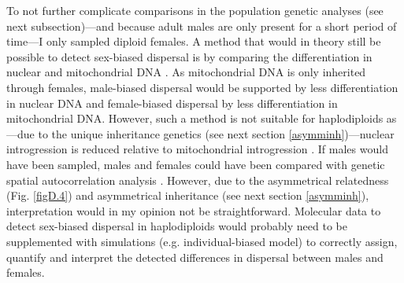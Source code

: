 \documentclass[10pt, twoside]{book} %
\begin{document}
	To not further complicate comparisons in the population genetic analyses (see next subsection)---and because adult males are only present for a short period of time---I only sampled diploid females. A method that would in theory still be possible to detect sex-biased dispersal is by comparing the differentiation in nuclear and mitochondrial DNA \citep[e.g. in][]{hardy2008}. As mitochondrial DNA is only inherited through females, male-biased dispersal would be supported by less differentiation in nuclear DNA and female-biased dispersal by less differentiation in mitochondrial DNA. However, such a method is not suitable for haplodiploids as---due to the unique inheritance genetics (see next section \ref{asymminh})---nuclear introgression is reduced relative to mitochondrial introgression \citep{patten2015}. If males would have been sampled, males and females could have been compared with genetic spatial autocorrelation analysis \citep{banks2012}. However, due to the asymmetrical relatedness (Fig. \ref{figD.4}) and asymmetrical inheritance (see next section \ref{asymminh}), interpretation would in my opinion not be straightforward. Molecular data to detect sex-biased dispersal in haplodiploids would probably need to be supplemented with simulations (e.g. individual-biased model) to correctly assign, quantify and interpret the detected differences in dispersal between males and females.\\
	\clearpage
	
\end{document}
